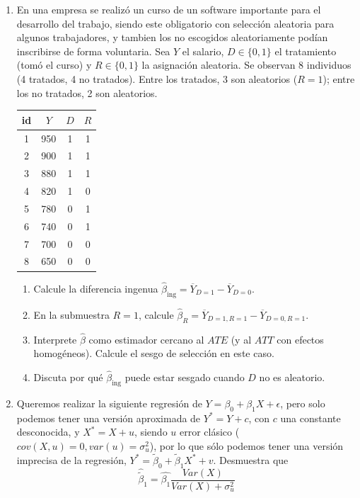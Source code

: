 \documentclass[10pt,a4paper]{article}
\begin{document}
\begin{enumerate}
\begin{enumerate}
\end{enumerate}




\item En una empresa se realizó un curso de un software importante para el desarrollo del trabajo, siendo este obligatorio con selección aleatoria para algunos trabajadores, y tambien los no escogidos aleatoriamente podían inscribirse de forma voluntaria.
Sea $Y$ el salario, $D\in\{0,1\}$ el tratamiento (tomó el curso) y $R\in\{0,1\}$ la asignación aleatoria.
Se observan 8 individuos (4 tratados, 4 no tratados). Entre los tratados, 3 son aleatorios ($R=1$); entre los no tratados, 2 son aleatorios.

\begin{center}
\begin{tabular}{|c| c |c |c|}
\hline
id & $Y$ & $D$ & $R$\\
\hline
1 & 950 & 1 & 1\\
2 & 900 & 1 & 1\\
3 & 880 & 1 & 1\\
4 & 820 & 1 & 0\\
5 & 780 & 0 & 1\\
6 & 740 & 0 & 1\\
7 & 700 & 0 & 0\\
8 & 650 & 0 & 0\\
\hline
\end{tabular}
\end{center}

\begin{enumerate}
\item Calcule la diferencia ingenua $\hat\beta_{\text{ing}}=\overline{Y}_{D=1}-\overline{Y}_{D=0}$.


\item En la submuestra $R=1$, calcule $\hat\beta_{R} = \overline{Y}_{D=1,R=1}-\overline{Y}_{D=0,R=1}$.


\item Interprete $\hat\beta$ como estimador cercano al $ATE$ (y al $ATT$ con efectos homogéneos). Calcule el sesgo de selección en este caso.

\item Discuta por qué $\hat\beta_{\text{ing}}$ puede estar sesgado cuando $D$ no es aleatorio.

\end{enumerate}

\item Queremos realizar la siguiente regresión de $Y=\beta_0+\beta_1X+\epsilon$, pero solo podemos tener una versión aproximada de $Y^*=Y+c$, con $c$ una constante desconocida, y $X^*=X+u$, siendo $u$ error clásico ($cov(X,u)=0, var(u)=\sigma^2_u$), por lo que sólo podemos tener una versión imprecisa de la regresión, $Y^* = \tilde\beta_0+\tilde\beta_1X^*+v$. Desmuestra que 
$$\hat{\tilde\beta}_1=\hat{\beta_1}\frac{Var(X)}{Var(X)+\sigma^2_u}$$

\end{enumerate}
\end{document}
